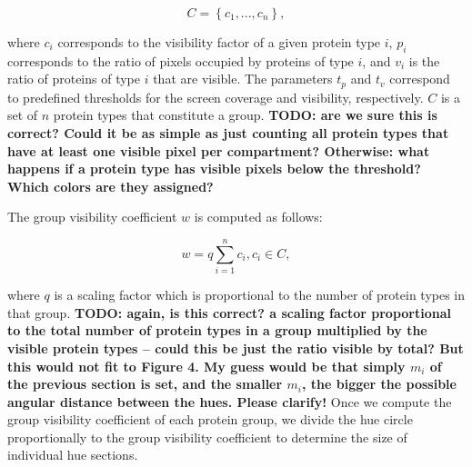 \documentclass{egpubl}
\begin{document}
	\begin{equation}
	C = \left\lbrace c_{1}, ... , c_{n} \right\rbrace,  
	\end{equation}
	
	where $c_i$ corresponds to the visibility factor of a given protein type $i$, $p_i$ corresponds to the ratio of pixels occupied by proteins of type $i$, and $v_i$ is the ratio of proteins of type $i$ that are visible.
	The parameters $t_{p}$ and $t_{v}$ correspond to predefined thresholds for the screen coverage and visibility, respectively. 
	$C$ is a set of $n$ protein types that constitute a group.
	\textbf{TODO: are we sure this is correct? Could it be as simple as just counting all protein types that have at least one visible pixel per compartment? Otherwise: what happens if a protein type has visible pixels below the threshold? Which colors are they assigned?}
	
	The group visibility coefficient $w$ is computed as follows:
	
	\begin{equation}
	w = q\sum_{i=1}^{n} c_{i}, c_{i} \in C, 
	\end{equation}
	
	where $q$ is a scaling factor which is proportional to the number of protein types in that group. 
	\textbf{TODO: again, is this correct? a scaling factor proportional to the total number of protein types in a group multiplied by the visible protein types -- could this be just the ratio visible by total? But this would not fit to Figure 4. My guess would be that simply $m_i$ of the previous section is set, and the smaller $m_i$, the bigger the possible angular distance between the hues. Please clarify!}
	Once we compute the group visibility coefficient of each protein group, we divide the hue circle proportionally to the group visibility coefficient to determine the size of individual hue sections. 
	
\end{document}
